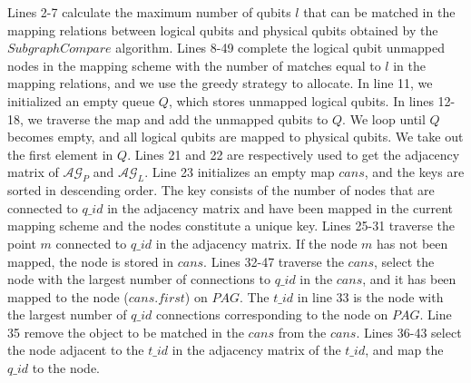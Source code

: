 \documentclass[runningheads]{llncs}
\begin{document}
Lines 2-7 calculate the maximum number of qubits $l$ that can be matched in the mapping relations 
between logical qubits and physical qubits obtained by the $SubgraphCompare$ algorithm.
Lines 8-49 complete the logical qubit unmapped nodes in the mapping scheme with the number 
of matches equal to $l$ in the mapping relations, and we use the greedy strategy to allocate.
In line 11, we initialized an empty queue $Q$, which stores unmapped logical qubits.
In lines 12-18, we traverse the map and add the unmapped qubits to $Q$.
We loop until $Q$ becomes empty, and all logical qubits are mapped to physical qubits.
We take out the first element in $Q$. 
Lines 21 and 22 are respectively used to get the adjacency matrix of $\mathcal{AG}_{P}$ and $\mathcal{AG}_{L}$. 
Line 23 initializes an empty map $cans$, and the keys are sorted in descending order. 
The key consists of the number of nodes that are connected to $q\_id$ in the adjacency 
matrix and have been mapped in the current mapping scheme and the nodes constitute a unique key.
Lines 25-31 traverse the point $m$ connected to $q\_id$ in the adjacency matrix. 
If the node $m$ has not been mapped, the node is stored in $cans$.
Lines 32-47 traverse the $cans$, select the node with the largest number of 
connections to $q\_id$ in the $cans$, and it has been mapped to the node ($cans.first$) 
on $PAG$.
The $t\_id$ in line 33 is the node with the largest number of $q\_id$ connections 
corresponding to the node on $PAG$.
Line 35  remove the object to be matched in the $cans$ from the $cans$.
Lines 36-43  select the node adjacent to the $t\_id$ in the adjacency matrix of the $t\_id$, 
and map the $q\_id$ to the node.
\end{document}
